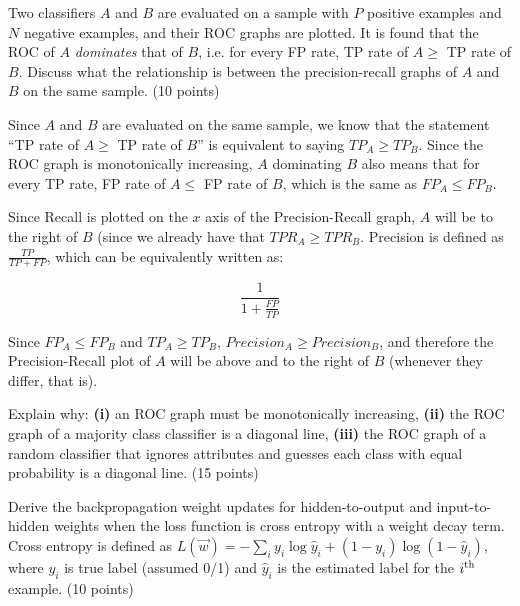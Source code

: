 \documentclass[fleqn]{homework}
\begin{document}
  \begin{problem}{3}
    \begin{question}
      Two classifiers $A$ and $B$ are evaluated on a sample with $P$ positive
      examples and $N$ negative examples, and their ROC graphs are plotted.  It
      is found that the ROC of $A$ \textit{dominates} that of $B$, i.e. for
      every FP rate, TP rate of $A \ge$ TP rate of $B$.  Discuss what the
      relationship is between the precision-recall graphs of $A$ and $B$ on the
      same sample. (10 points)
    \end{question}

    Since $A$ and $B$ are evaluated on the same sample, we know that the
    statement ``TP rate of $A \ge$ TP rate of $B$'' is equivalent to saying
    $TP_A \ge TP_B$.  Since the ROC graph is monotonically increasing, $A$
    dominating $B$ also means that for every TP rate, FP rate of $A \le$ FP rate
    of $B$, which is the same as $FP_A \le FP_B$.

    Since Recall is plotted on the $x$ axis of the Precision-Recall graph, $A$
    will be to the right of $B$ (since we already have that $TPR_A \ge TPR_B$.
    Precision is defined as $\frac{TP}{TP+FP}$, which can be equivalently
    written as:

    \begin{equation*}
      \frac{1}{1+\frac{FP}{TP}}
    \end{equation*}

    Since $FP_A \le FP_B$ and $TP_A \ge TP_B$, $Precision_A \ge Precision_B$,
    and therefore the Precision-Recall plot of $A$ will be above and to the
    right of $B$ (whenever they differ, that is).
  \end{problem}

  \begin{problem}{4}
    \begin{question}
      Explain why: \textbf{(i)} an ROC graph must be monotonically increasing,
      \textbf{(ii)} the ROC graph of a majority class classifier is a diagonal
      line, \textbf{(iii)} the ROC graph of a random classifier that ignores
      attributes and guesses each class with equal probability is a diagonal
      line. (15 points)
    \end{question}
  \end{problem}

  \begin{problem}{5}
    \begin{question}
      Derive the backpropagation weight updates for hidden-to-output and
      input-to-hidden weights when the loss function is cross entropy with a
      weight decay term.  Cross entropy is defined as
      $L(\vec{w}) = -\sum_i y_i \log \hat{y}_i + (1-y_i)\log(1-\hat{y}_i)$,
      where $y_i$ is true label (assumed 0/1) and $\hat{y}_i$ is the estimated
      label for the $i\textsuperscript{th}$ example. (10 points)
    \end{question}
  \end{problem}
\end{document}
